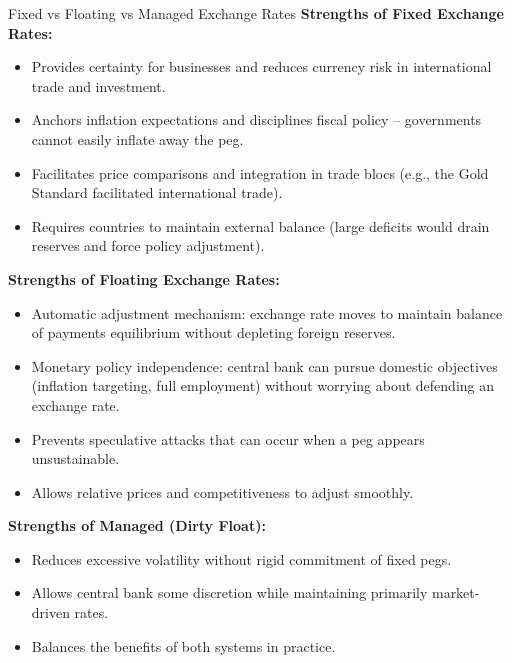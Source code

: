 \documentclass[11pt, a4paper, twoside]{book}
\begin{document}
\begin{evaluation}{Fixed vs Floating vs Managed Exchange Rates}
\textbf{Strengths of Fixed Exchange Rates:}
\begin{itemize}
  \item Provides certainty for businesses and reduces currency risk in international trade and investment.
  \item Anchors inflation expectations and disciplines fiscal policy -- governments cannot easily inflate away the peg.
  \item Facilitates price comparisons and integration in trade blocs (e.g., the Gold Standard facilitated international trade).
  \item Requires countries to maintain external balance (large deficits would drain reserves and force policy adjustment).
\end{itemize}

\textbf{Strengths of Floating Exchange Rates:}
\begin{itemize}
  \item Automatic adjustment mechanism: exchange rate moves to maintain balance of payments equilibrium without depleting foreign reserves.
  \item Monetary policy independence: central bank can pursue domestic objectives (inflation targeting, full employment) without worrying about defending an exchange rate.
  \item Prevents speculative attacks that can occur when a peg appears unsustainable.
  \item Allows relative prices and competitiveness to adjust smoothly.
\end{itemize}

\textbf{Strengths of Managed (Dirty Float):}
\begin{itemize}
  \item Reduces excessive volatility without rigid commitment of fixed pegs.
  \item Allows central bank some discretion while maintaining primarily market-driven rates.
  \item Balances the benefits of both systems in practice.
\end{itemize}


\end{evaluation}
\end{document}
